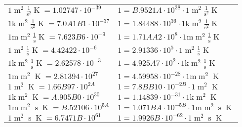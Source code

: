 \begin{center}
\begin{longtable}{l l}
{\color{black}$1 \bm{\mathrm{ }}{\operatorname{m}^2}\frac1{\operatorname{s}^2}{}{\operatorname{K}} = 1.02747\cdot10^{-39} $}   & {\color{black}$ 1 = B.9521A\cdot10^{38} \cdot 1 \bm{\mathrm{ }}{\operatorname{m}^2}\frac1{\operatorname{s}^2}{}{\operatorname{K}}$}  \\
{\color{gray}$1 \bm{\mathrm{ k}}{\operatorname{m}^2}\frac1{\operatorname{s}^2}{}{\operatorname{K}} = 7.0A1B1\cdot10^{-37} $}   & {\color{gray}$ 1 = 1.84488\cdot10^{36} \cdot 1 \bm{\mathrm{ k}}{\operatorname{m}^2}\frac1{\operatorname{s}^2}{}{\operatorname{K}}$}  \\
{\color{gray}$1 \bm{\mathrm{ m}}{\operatorname{m}^2}\frac1{\operatorname{s}}{}{\operatorname{K}} = 7.623B6\cdot10^{-9} $}   & {\color{gray}$ 1 = 1.71AA2\cdot10^{8} \cdot 1 \bm{\mathrm{ m}}{\operatorname{m}^2}\frac1{\operatorname{s}}{}{\operatorname{K}}$}  \\
{\color{black}$1 \bm{\mathrm{ }}{\operatorname{m}^2}\frac1{\operatorname{s}}{}{\operatorname{K}} = 4.42422\cdot10^{-6} $}   & {\color{black}$ 1 = 2.91336\cdot10^{5} \cdot 1 \bm{\mathrm{ }}{\operatorname{m}^2}\frac1{\operatorname{s}}{}{\operatorname{K}}$}  \\
{\color{gray}$1 \bm{\mathrm{ k}}{\operatorname{m}^2}\frac1{\operatorname{s}}{}{\operatorname{K}} = 2.62578\cdot10^{-3} $}   & {\color{gray}$ 1 = 4.925A7\cdot10^{2} \cdot 1 \bm{\mathrm{ k}}{\operatorname{m}^2}\frac1{\operatorname{s}}{}{\operatorname{K}}$}  \\
{\color{gray}$1 \bm{\mathrm{ m}}{\operatorname{m}^2}{}{}{\operatorname{K}} = 2.81394\cdot10^{27} $}   & {\color{gray}$ 1 = 4.59958\cdot10^{-28} \cdot 1 \bm{\mathrm{ m}}{\operatorname{m}^2}{}{}{\operatorname{K}}$}  \\
{\color{black}$1 \bm{\mathrm{ }}{\operatorname{m}^2}{}{}{\operatorname{K}} = 1.66B97\cdot10^{2A} $}   & {\color{black}$ 1 = 7.8BB10\cdot10^{-2B} \cdot 1 \bm{\mathrm{ }}{\operatorname{m}^2}{}{}{\operatorname{K}}$}  \\
{\color{gray}$1 \bm{\mathrm{ k}}{\operatorname{m}^2}{}{}{\operatorname{K}} = A.905B0\cdot10^{30} $}   & {\color{gray}$ 1 = 1.14839\cdot10^{-31} \cdot 1 \bm{\mathrm{ k}}{\operatorname{m}^2}{}{}{\operatorname{K}}$}  \\
{\color{gray}$1 \bm{\mathrm{ m}}{\operatorname{m}^2}{\operatorname{s}}{}{\operatorname{K}} = B.52106\cdot10^{5A} $}   & {\color{gray}$ 1 = 1.071BA\cdot10^{-5B} \cdot 1 \bm{\mathrm{ m}}{\operatorname{m}^2}{\operatorname{s}}{}{\operatorname{K}}$}  \\
{\color{black}$1 \bm{\mathrm{ }}{\operatorname{m}^2}{\operatorname{s}}{}{\operatorname{K}} = 6.7471B\cdot10^{61} $}   & {\color{black}$ 1 = 1.9926B\cdot10^{-62} \cdot 1 \bm{\mathrm{ }}{\operatorname{m}^2}{\operatorname{s}}{}{\operatorname{K}}$}  \\

\end{longtable}
\end{center}
